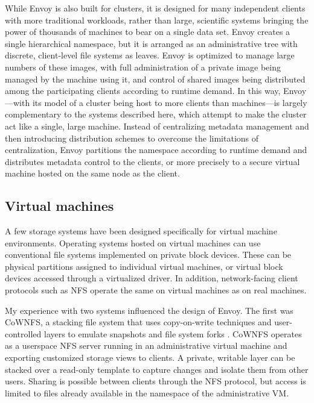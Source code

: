 While Envoy is also built for clusters, it is designed for many independent clients with more traditional workloads, rather than large, scientific systems bringing the power of thousands of machines to bear on a single data set. Envoy creates a single hierarchical namespace, but it is arranged as an administrative tree with discrete, client-level file systems as leaves. Envoy is optimized to manage large numbers of these images, with full administration of a private image being managed by the machine using it, and control of shared images being distributed among the participating clients according to runtime demand. In this way, Envoy---with its model of a cluster being host to more clients than machines---is largely complementary to the systems described here, which attempt to make the cluster act like a single, large machine. Instead of centralizing metadata management and then introducing distribution schemes to overcome the limitations of centralization, Envoy partitions the namespace according to runtime demand and distributes metadata control to the clients, or more precisely to a secure virtual machine hosted on the same node as the client.

\subsection{Virtual machines}

A few storage systems have been designed specifically for virtual machine environments. Operating systems hosted on virtual machines can use conventional file systems implemented on private block devices. These can be physical partitions assigned to individual virtual machines, or virtual block devices accessed through a virtualized driver. In addition, network-facing client protocols such as NFS operate the same on virtual machines as on real machines.

My experience with two systems influenced the design of Envoy. The first was CoWNFS, a stacking file system that uses copy-on-write techniques and user-controlled layers to emulate snapshots and file system forks \cite{kotsovinos04b}. CoWNFS operates as a userspace NFS server running in an administrative virtual machine and exporting customized storage views to clients. A private, writable layer can be stacked over a read-only template to capture changes and isolate them from other users. Sharing is possible between clients through the NFS protocol, but access is limited to files already available in the namespace of the administrative VM.

